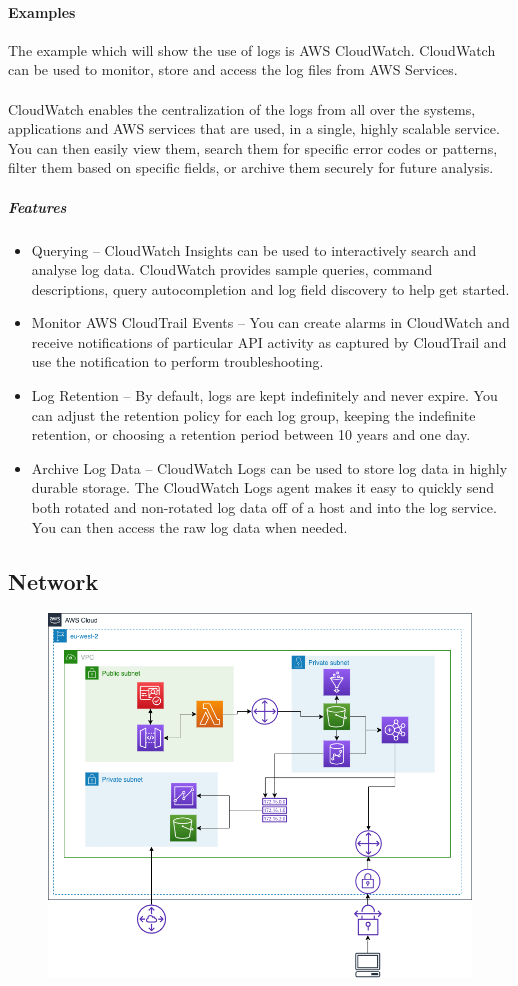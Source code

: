 \documentclass[10pt]{article}
\begin{document}
\paragraph{Examples}
The example which will show the use of logs is AWS CloudWatch. CloudWatch can be used to monitor, store and access the log files from AWS Services.
\\ \\
CloudWatch enables the centralization of the logs from all over the systems, applications and AWS services that are used, in a single, highly scalable service. You can then easily view them, search them for specific error codes or patterns, filter them based on specific fields, or archive them securely for future analysis. \cite{aws-cloudwatch}
\subparagraph{Features}
\begin{itemize}
	\item Querying – CloudWatch Insights can be used to interactively search and analyse log data. CloudWatch provides sample queries, command descriptions, query autocompletion and log field discovery to help get started. 
	\item Monitor AWS CloudTrail Events – You can create alarms in CloudWatch and receive notifications of particular API activity as captured by CloudTrail and use the notification to perform troubleshooting.
	\item Log Retention – By default, logs are kept indefinitely and never expire. You can adjust the retention policy for each log group, keeping the indefinite retention, or choosing a retention period between 10 years and one day.
	\item Archive Log Data – CloudWatch Logs can be used to store log data in highly durable storage. The CloudWatch Logs agent makes it easy to quickly send both rotated and non-rotated log data off of a host and into the log service. You can then access the raw log data when needed.
\end{itemize}

\subsection{Network}
\label{sec:network}
\begin{figure}[h!]
	\centering
	\includegraphics[width=0.8\linewidth]{images/Network.png}
\end{figure}
\end{document}

